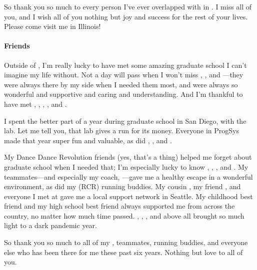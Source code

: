 So thank you so much to every person I've ever overlapped with in .
I miss all of you, and I wish all of you nothing but joy and success for the rest of your lives.
Please come visit me in Illinois!

\paragraph{Friends}
Outside of , I'm really lucky to have met some amazing graduate school  I can't imagine my life without.
Not a day will pass when I won't miss , , and ---they were always
there by my side when I needed them most,
and were always so wonderful and supportive and caring and understanding.
And I'm thankful to have met , ,
, , and .

I spent the better part of a year during graduate school in San Diego, with the  lab.
Let me tell you, that lab gives  a run for its money.
Everyone in ProgSys made that year super fun and valuable,
as did , , and .

My Dance Dance Revolution friends (yes, that's a thing) helped me forget about graduate school when I needed that;
I'm especially lucky to know , , , and .
My  teammates---and especially my coach, ---gave me a healthy escape in a wonderful environment,
as did my  (RCR) running buddies.
My cousin , my friend , and everyone I met at  gave me a local support network in Seattle.
My childhood best friend  and my high school best friend  always supported me from across the country,
no matter how much time passed. , , , and above all  brought so much light to a dark pandemic year.

So thank you so much to all of my ,  teammates,  running buddies, and everyone else who has been there for me these past six years.
Nothing but love to all of you.

